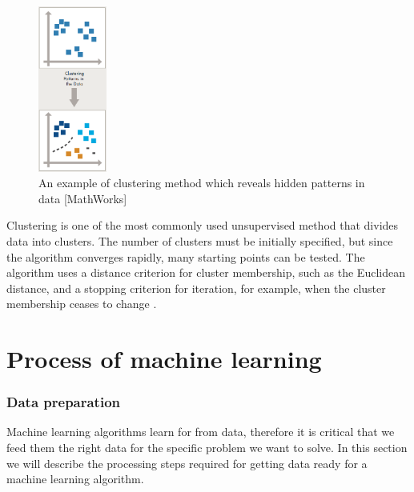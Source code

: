 \begin{figure}[H]
  \centering
    \includegraphics[width=0.2\textwidth]{images/cluster.png}
    \caption{An example of clustering method which reveals hidden patterns in data [MathWorks]}
  \label{datagrowth.png}
\end{figure}

Clustering is one of the most commonly used unsupervised method that divides data into clusters. The number of clusters must be initially specified, but since the algorithm converges rapidly, many starting points can be tested. The algorithm uses a distance
criterion for cluster membership, such as the Euclidean distance, and a stopping criterion for iteration, for example, when the cluster membership ceases to change \citep{ball2010data}.

\section{Process of machine learning}
\label{Process}
\subsubsection{Data preparation}
Machine learning algorithms learn for from data, therefore it is critical that we feed them the right data for the specific problem we want to solve. In this section we will describe the processing steps required for getting data ready for a machine learning algorithm.

